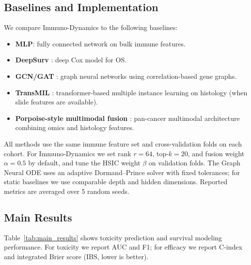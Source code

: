\documentclass{article}
\begin{document}
\subsection{Baselines and Implementation}

We compare Immuno-Dynamics to the following baselines:

\begin{itemize}
    \item \textbf{MLP}: fully connected network on bulk immune features.
    \item \textbf{DeepSurv} \cite{katzman2018deepsurv}: deep Cox model for OS.
    \item \textbf{GCN/GAT} \cite{kipf2017semi,velickovic2018graph}: graph neural networks using correlation-based gene graphs.
    \item \textbf{TransMIL} \cite{shao2021transmil}: transformer-based multiple instance learning on histology (when slide features are available).
    \item \textbf{Porpoise-style multimodal fusion} \cite{chen2022pan}: pan-cancer multimodal architecture combining omics and histology features.
\end{itemize}

All methods use the same immune feature set and cross-validation folds on each cohort.
For Immuno-Dynamics we set rank $r{=}64$, top-$k{=}20$, and fusion weight $\alpha{=}0.5$ by default, and tune the HSIC weight $\beta$ on validation folds.
The Graph Neural ODE uses an adaptive Dormand--Prince solver with fixed tolerances; for static baselines we use comparable depth and hidden dimensions.
Reported metrics are averaged over 5 random seeds.

\subsection{Main Results}

Table~\ref{tab:main_results} shows toxicity prediction and survival modeling performance.
For toxicity we report AUC and F1; for efficacy we report C-index and integrated Brier score (IBS, lower is better).
\end{document}
